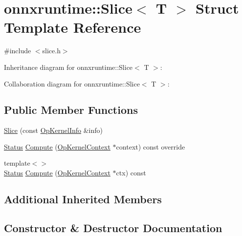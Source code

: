 \hypertarget{structonnxruntime_1_1Slice}{}\section{onnxruntime\+:\+:Slice$<$ T $>$ Struct Template Reference}
\label{structonnxruntime_1_1Slice}


{\ttfamily \#include $<$slice.\+h$>$}



Inheritance diagram for onnxruntime\+:\+:Slice$<$ T $>$\+:


Collaboration diagram for onnxruntime\+:\+:Slice$<$ T $>$\+:
\subsection*{Public Member Functions}
\begin{DoxyCompactItemize}
\item 
\mbox{\hyperlink{structonnxruntime_1_1Slice_a527bfbcedec918db15b9e3dd86f91f47}{Slice}} (const \mbox{\hyperlink{classonnxruntime_1_1OpKernelInfo}{Op\+Kernel\+Info}} \&info)
\item 
\mbox{\hyperlink{classonnxruntime_1_1common_1_1Status}{Status}} \mbox{\hyperlink{structonnxruntime_1_1Slice_a44cc8d7c3f69c78672af24126150a2d2}{Compute}} (\mbox{\hyperlink{classonnxruntime_1_1OpKernelContext}{Op\+Kernel\+Context}} $\ast$context) const override
\item 
{\footnotesize template$<$$>$ }\\\mbox{\hyperlink{classonnxruntime_1_1common_1_1Status}{Status}} \mbox{\hyperlink{structonnxruntime_1_1Slice_a068e219ac9fe41b220bb59b8facd3b24}{Compute}} (\mbox{\hyperlink{classonnxruntime_1_1OpKernelContext}{Op\+Kernel\+Context}} $\ast$ctx) const
\end{DoxyCompactItemize}
\subsection*{Additional Inherited Members}


\subsection{Constructor \& Destructor Documentation}
\mbox{\label{structonnxruntime_1_1Slice_a527bfbcedec918db15b9e3dd86f91f47}} 
